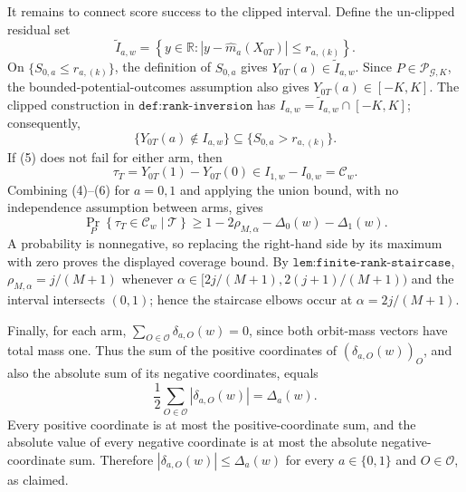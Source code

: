It remains to connect score success to the clipped interval. Define the un-clipped residual set
\[
\widetilde I_{a,w}=\left\{y\in\mathbb R:\left|y-\widehat m_a(X_{0T})\right|\le r_{a,(k)}\right\}.
\]
On \(\{S_{0,a}\le r_{a,(k)}\}\), the definition of \(S_{0,a}\) gives \(Y_{0T}(a)\in\widetilde I_{a,w}\). Since \(P\in\mathcal P_{\mathcal G,K}\), the bounded-potential-outcomes assumption also gives \(Y_{0T}(a)\in[-K,K]\). The clipped construction in \(\texttt{def:rank-inversion}\) has \(I_{a,w}=\widetilde I_{a,w}\cap[-K,K]\); consequently,
\[
\{Y_{0T}(a)\notin I_{a,w}\}\subseteq\{S_{0,a}>r_{a,(k)}\}.
\tag{5}
\]
If (5) does not fail for either arm, then
\[
\tau_T=Y_{0T}(1)-Y_{0T}(0)\in I_{1,w}-I_{0,w}=\mathcal C_w.
\tag{6}
\]
Combining (4)--(6) for \(a=0,1\) and applying the union bound, with no independence assumption between arms, gives
\[
\Pr_P\!\left\{\tau_T\in\mathcal C_w\mid\mathcal T\right\}
\ge 1-2\rho_{M,\alpha}-\Delta_0(w)-\Delta_1(w).
\]
A probability is nonnegative, so replacing the right-hand side by its maximum with zero proves the displayed coverage bound. By \(\texttt{lem:finite-rank-staircase}\), \(\rho_{M,\alpha}=j/(M+1)\) whenever \(\alpha\in[2j/(M+1),2(j+1)/(M+1))\) and the interval intersects \((0,1)\); hence the staircase elbows occur at \(\alpha=2j/(M+1)\).

Finally, for each arm, \(\sum_{O\in\mathcal O}\delta_{a,O}(w)=0\), since both orbit-mass vectors have total mass one. Thus the sum of the positive coordinates of \((\delta_{a,O}(w))_O\), and also the absolute sum of its negative coordinates, equals
\[
\frac12\sum_{O\in\mathcal O}|\delta_{a,O}(w)|=\Delta_a(w).
\]
Every positive coordinate is at most the positive-coordinate sum, and the absolute value of every negative coordinate is at most the absolute negative-coordinate sum. Therefore \(|\delta_{a,O}(w)|\le\Delta_a(w)\) for every \(a\in\{0,1\}\) and \(O\in\mathcal O\), as claimed.